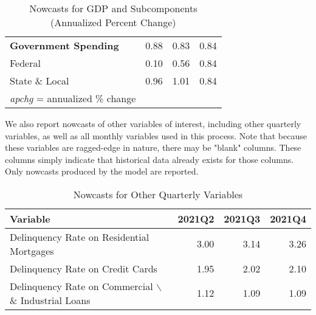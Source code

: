 \documentclass[11pt, letterpaper]{article}\usepackage[]{graphicx}\usepackage[]{color}
\begin{document}
\begin{table}[H]
\begin{tabular}{lrrr}
  \hspace{0mm} \textbf{Government Spending} & 0.88 & 0.83 & 0.84 \\ 
  \hspace{8mm}  Federal & 0.10 & 0.56 & 0.84 \\ 
  \hspace{8mm}  State \& Local & 0.96 & 1.01 & 0.84 \\ 
   \hline 
 \textit{apchg} = annualized \% change 
\end{tabular}
\endgroup
\caption{Nowcasts for GDP and Subcomponents (Annualized Percent Change)} 
\end{table}


We also report nowcasts of other variables of interest, including other quarterly variables, as well as all monthly variables used in this process. Note that because these variables are ragged-edge in nature, there may be "blank" columns. These columns simply indicate that historical data already exists for those columns. Only nowcasts produced by the model are reported.
\begin{table}[H]
\centering
\begingroup\fontsize{11pt}{13pt}\selectfont
\begin{tabular}{lrrr}
  \hline
Variable & 2021Q2 & 2021Q3 & 2021Q4 \\ 
  \hline
Delinquency Rate on Residential Mortgages & 3.00 & 3.14 & 3.26 \\ 
  Delinquency Rate on Credit Cards & 1.95 & 2.02 & 2.10 \\ 
  Delinquency Rate on Commercial $\backslash$\& Industrial Loans & 1.12 & 1.09 & 1.09 \\ 
   \hline
\end{tabular}
\endgroup
\caption{Nowcasts for Other Quarterly Variables} 
\end{table}
\end{document}
